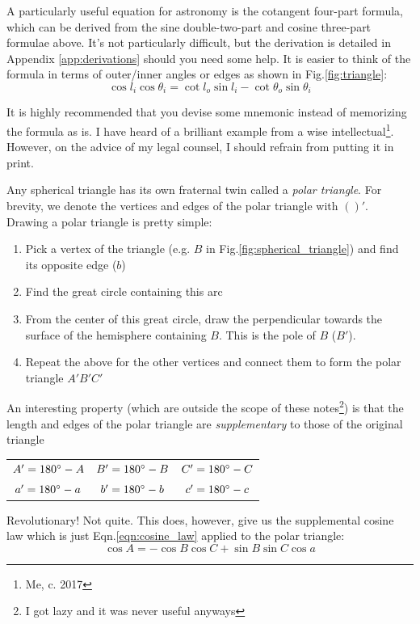 \documentclass{article}
\begin{document}
A particularly useful equation for astronomy is the cotangent four-part formula, which can be derived from the sine double-two-part and cosine three-part formulae above. It's not particularly difficult, but the derivation is detailed in Appendix \ref{app:derivations} should you need some help. It is easier to think of the formula in terms of outer/inner angles or edges as shown in Fig.\;\ref{fig:triangle}:
\begin{equation}
    \label{eqn:cotangent_four_part}
    \cos l_i \cos \theta_i = \cot l_o \sin l_i - \cot \theta_o \sin \theta_i
\end{equation}

It is highly recommended that you devise some mnemonic instead of memorizing the formula as is. I have heard of a brilliant example from a wise intellectual\footnote{Me, c. 2017}. However, on the advice of my legal counsel, I should refrain from putting it in print.

\crule

Any spherical triangle has its own fraternal twin called a \textit{polar triangle}. For brevity, we denote the vertices and edges of the polar triangle with $()'$. Drawing a polar triangle is pretty simple:
\begin{enumerate}
    \item Pick a vertex of the triangle (e.g. $B$ in Fig.\;\ref{fig:spherical_triangle}) and find its opposite edge ($b$)
    \item Find the great circle containing this arc
    \item From the center of this great circle, draw the perpendicular towards the surface of the hemisphere containing $B$. This is the pole of $B$ ($B'$).
    \item Repeat the above for the other vertices and connect them to form the polar triangle $A'B'C'$
\end{enumerate}

An interesting property (which are outside the scope of these notes\footnote{I got lazy and it was never useful anyways}) is that the length and edges of the polar triangle are \textit{supplementary} to those of the original triangle
\medskip
\begin{center}
\begin{tabular*}{0.6\textwidth}{@{\extracolsep{\fill} }ccc}
    $A' = 180{}^{\circ} - A$ & $B' = 180{}^{\circ} - B$ & $C' = 180{}^{\circ} - C$ \\
    $a' = 180{}^{\circ} - a$ & $b' = 180{}^{\circ} - b$ & $c' = 180{}^{\circ} - c$
\end{tabular*}
\end{center}
\medskip
Revolutionary! Not quite. This does, however, give us the supplemental cosine law which is just Eqn.\;\ref{eqn:cosine_law} applied to the polar triangle:
\begin{equation}
    \cos A = -\cos B \cos C + \sin B \sin C \cos a
\end{equation}
\end{document}
